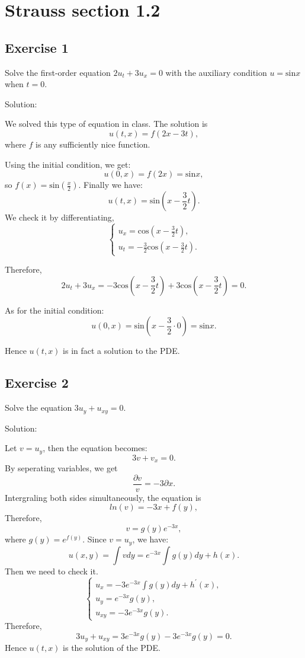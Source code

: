 \documentclass{article}
\begin{document}
\section{Strauss section 1.2}
\subsection{Exercise 1}
			Solve the first-order equation
			$2u_t +3u_ x =0$ with the auxiliary condition $u=\text{sin}x$ when $t=0.$

			Solution:

			We solved this type of equation in class.
			The solution is 
			\[ u(t,x)=f(2x-3t),\]
			where $f$ is any sufficiently nice function.

			Using the initial condition, we get:
			\[u(0,x)=f(2x)=\text{sin}x,\]
			so $f(x)=\text{sin}\left(\frac{x}{2}\right)$.
			Finally we have:
			\[u(t,x)=\text{sin}\left(x-\frac{3}{2}t\right).\]
			We check it by differentiating,
			\begin{equation*}
				\begin{cases}
					u_x=\text{cos}\left(x-\frac{3}{2}t\right),
					\\
					u_t=-\frac{3}{2}\text{cos}\left(x-\frac{3}{2}t\right).
				\end{cases}
			\end{equation*}

			Therefore,
			\[ 2u_t +3u_x=-3\text{cos}\left(x-\frac{3}{2}t\right) + 3\text{cos}\left(x-\frac{3}{2}t\right)=0.\]

			As for the initial condition:
			\[u(0,x)=\text{sin}\left(x-\frac{3}{2}\cdot0\right)=\text{sin}x.\]

			Hence $u(t,x)$ is in fact a solution to the PDE.

		\subsection{Exercise 2}
		Solve the equation $3u_y + u_{xy} =0.$

			Solution:

			Let $v=u_y$, then the equation becomes:
			\[3v+v_x=0.\]
			By seperating variables, we get \[\frac{\partial v}{v}=-3\partial x.\]
			Intergraling both sides simultaneously, the equation is \[ ln(v) = -3x + f(y),  \]
			Therefore, \[ v = g(y)e^{-3x},\]
			where $g(y)=e^{f(y)}$.
			Since $v=u_y$, we have:
			\[u(x,y)=\int vdy = e^{-3x}\int g(y)dy + h(x).\]
			Then we need to check it.
			\begin{equation*}
				\begin{cases}
					u_{x}=-3e^{-3x}\int g(y)dy + h^{'}(x),
					\\
					u_{y}=e^{-3x} g(y),
					\\
					u_{xy}=-3e^{-3x} g(y).
				\end{cases}
			\end{equation*}
			Therefore, \[3u_y + u_{xy}=3e^{-3x} g(y)-3e^{-3x} g(y)=0.\]
            Hence $u(t,x)$ is the solution of the PDE.
\end{document}
